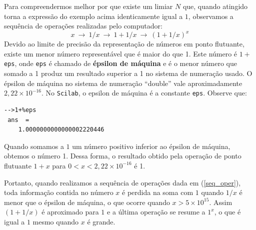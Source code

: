 \documentclass[main.tex]{subfiles}
\begin{document}
Para compreendermos melhor por que existe um limiar $N$ que, quando atingido torna a expressão do exemplo acima identicamente igual a $1$, observamos a sequência de operações realizadas pelo computador:
\begin{equation}\label{seq_oper}
x~\to ~1/x ~\to ~1+1/x ~\to ~(1+1/x)^x
\end{equation}
Devido ao limite de precisão da representação de números em ponto flutuante, existe um menor número representável que é maior do que 1. Este número é $1 + $\verb+eps+, onde \verb+eps+ é chamado de {\bf épsilon de máquina} e é o menor número que somado a 1 produz um resultado superior a 1 no sistema de numeração usado. O épsilon de máquina no sistema de numeração ``double'' vale aproximadamente $2,22\times 10^{-16}$.
\ifisscilab
No \verb+Scilab+, o epsilon de máquina é a constante \verb+eps+. Observe que:
\begin{verbatim}
-->1+%eps
 ans  =
    1.0000000000000002220446 
\end{verbatim}
\fi
Quando somamos a $1$ um número positivo inferior ao épsilon de máquina, obtemos o número 1. Dessa forma, o resultado obtido pela operação de ponto flutuante $1+x$ para $0<x<2,22 \times 10^{-16}$ é 1. 

Portanto, quando realizamos a sequência de operações dada em (\ref{seq_oper}), toda informação contida no número $x$ é perdida na soma com $1$ quando $1/x$ é menor que o épsilon de máquina, o que ocorre quando $x>5\times 10^{15}$. Assim $(1+1/x)$ é aproximado para $1$ e a última operação se resume a $1^x$, o que é igual a $1$ mesmo quando $x$ é grande.
\end{document}
